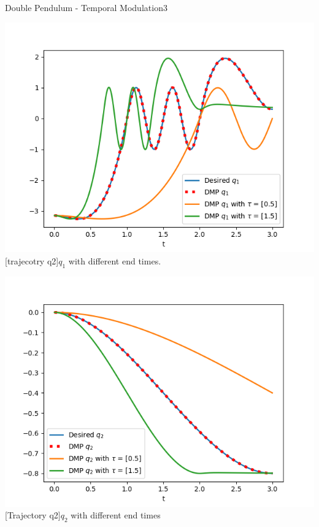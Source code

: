 \begin{questions}
\begin{question}{Double Pendulum - Temporal Modulation}{3}
\begin{answer}
\begin{center}
	\begin{minipage}{0.45\linewidth} 
		\centering
		\includegraphics[width=\linewidth]{img/2f-q1.png}
		[trajecotry q2]{$q_1$ with different end times.}
		\label{fig:q1_new_t}
	\end{minipage}
	\hfill
	\begin{minipage}{0.45\linewidth} 
		\centering
		\includegraphics[width=\linewidth]{img/2f-q2.png}
		[Trajectory q2]{$q_2$ with different end times}
		\label{fig:q2_new_t}
	\end{minipage}
\end{center}
\end{answer}



\end{question}
\end{questions}
